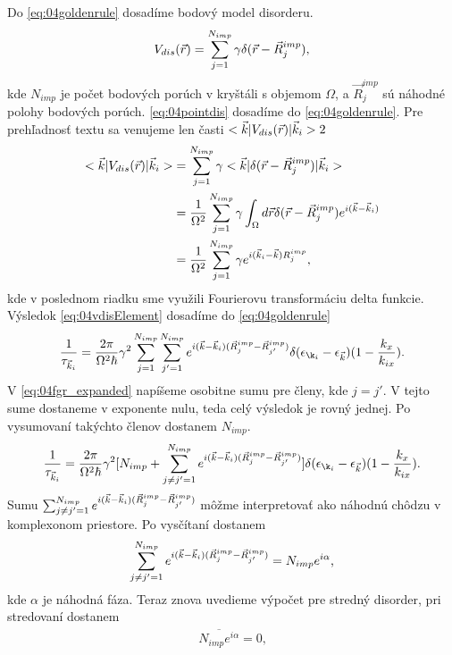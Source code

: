 Do \eqref{eq:04goldenrule} dosadíme bodový model disorderu.
\begin{align}
\label{eq:04pointdis}
V_{dis}(\vec{r})=\sum_{j=1}^{N_{imp}}\gamma \delta(\vec{r}-\vec R_j^{imp})\text{,}
\end{align}
kde $N_{imp}$ je počet bodových porúch v kryštáli s objemom $\Omega$, a $\vec R^{imp}_j$ sú náhodné polohy bodových porúch. 
\eqref{eq:04pointdis} dosadíme do \eqref{eq:04goldenrule}. Pre prehľadnosť textu sa venujeme len časti $<\vec{k}|V_{dis}(\vec{r})|\vec{k}_i>2$
\begin{align}
\label{eq:04vdisElement}
\notag
<\vec{k}|V_{dis}(\vec{r})|\vec{k}_i>&=\sum_{j=1}^{N_{imp}}\gamma<\vec{k}|\delta(\vec{r}-\vec R^{imp}_j)|\vec{k}_i>\\
\notag
&=\frac{1}{\Omega^2}\sum_{j=1}^{N_{imp}}\gamma\int_{\Omega}d\vec{r}\delta(\vec{r} -\vec R_j^{imp})e^{i(\vec{k}-\vec{k}_i)}\\
&=\frac{1}{\Omega^2}\sum_{j=1}^{N_{imp}}\gamma e^{i(\vec{k}_i-\vec{k})R_j^{imp}} \text{,}
\end{align}
kde v poslednom riadku sme využili Fourierovu transformáciu delta funkcie. Výsledok \eqref{eq:04vdisElement} dosadíme do \eqref{eq:04goldenrule}
\begin{align}
\label{eq:04fgr_expanded}
\frac{1}{\tau_{\vk_i}} = \frac{2\pi}{\Omega^2\hbar}\gamma^2\sum_{j=1}^{N_{imp}}\sum_{j'=1}^{N_{imp}}e^{i(\vk-\vk_i)(\vec R^{imp}_j-\vec R^{imp}_{j'})}\delta(\epsilon_{\k_i}-\epsilon_{\vk})(1-\frac{k_x}{k_{ix}}) \text{.}
\end{align}
V \eqref{eq:04fgr_expanded} napíšeme osobitne sumu pre členy, kde $j=j'$. V tejto sume dostaneme v exponente nulu, teda celý výsledok je rovný jednej. Po vysumovaní takýchto členov dostanem $N_{imp}$.
\begin{align}
\label{eq:04fgr_expanded2}
\frac{1}{\tau_{\vk_i}} = \frac{2\pi}{\Omega^2\hbar}\gamma^2[N_{imp}+\sum_{j\neq j'=1}^{N_{imp}}e^{i(\vk-\vk_i)(\vec R^{imp}_j-\vec R^{imp}_{j'})}]\delta(\epsilon_{\k_i}-\epsilon_{\vk})(1-\frac{k_x}{k_{ix}}) \text{.}
\end{align}
Sumu $\sum_{j\neq j'=1}^{N_{imp}}e^{i(\vec{k}-\vec{k}_i)(\vec R^{imp}_j-\vec R^{imp}_{j'})}$ môžme interpretovať ako náhodnú chôdzu v komplexonom priestore. Po vysčítaní dostanem
\begin{align}
\sum_{j\neq j'=1}^{N_{imp}}e^{i(\vec{k}-\vec{k}_i)(\vec R^{imp}_j-\vec R^{imp}_{j'})} =N_{imp}e^{i\alpha}\text{,}
\end{align}
kde $\alpha$ je náhodná fáza. Teraz znova uvedieme výpočet pre stredný disorder, pri stredovaní dostanem
\begin{align}
\overline{N_{imp}e^{i\alpha}}=0\text{,}
\end{align}
